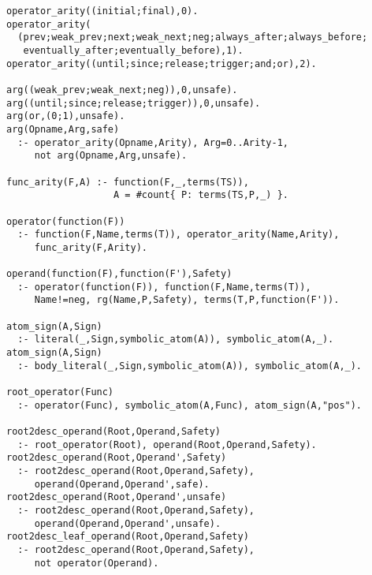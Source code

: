 \begin{center}
\begin{minipage}{\linewidth}
  \begin{lstlisting}[]
operator_arity((initial;final),0).
operator_arity(
  (prev;weak_prev;next;weak_next;neg;always_after;always_before;
   eventually_after;eventually_before),1).
operator_arity((until;since;release;trigger;and;or),2).

arg((weak_prev;weak_next;neg)),0,unsafe).
arg((until;since;release;trigger)),0,unsafe).
arg(or,(0;1),unsafe).
arg(Opname,Arg,safe)
  :- operator_arity(Opname,Arity), Arg=0..Arity-1, 
     not arg(Opname,Arg,unsafe).

func_arity(F,A) :- function(F,_,terms(TS)), 
                   A = #count{ P: terms(TS,P,_) }.

operator(function(F))
  :- function(F,Name,terms(T)), operator_arity(Name,Arity), 
     func_arity(F,Arity).

operand(function(F),function(F'),Safety)
  :- operator(function(F)), function(F,Name,terms(T)), 
     Name!=neg, rg(Name,P,Safety), terms(T,P,function(F')).

atom_sign(A,Sign)
  :- literal(_,Sign,symbolic_atom(A)), symbolic_atom(A,_).
atom_sign(A,Sign)
  :- body_literal(_,Sign,symbolic_atom(A)), symbolic_atom(A,_).

root_operator(Func)
  :- operator(Func), symbolic_atom(A,Func), atom_sign(A,"pos").

root2desc_operand(Root,Operand,Safety)
  :- root_operator(Root), operand(Root,Operand,Safety).
root2desc_operand(Root,Operand',Safety)
  :- root2desc_operand(Root,Operand,Safety), 
     operand(Operand,Operand',safe).
root2desc_operand(Root,Operand',unsafe)
  :- root2desc_operand(Root,Operand,Safety), 
     operand(Operand,Operand',unsafe).
root2desc_leaf_operand(Root,Operand,Safety)
  :- root2desc_operand(Root,Operand,Safety), 
     not operator(Operand).

\end{lstlisting}
\end{minipage}
\end{center}


